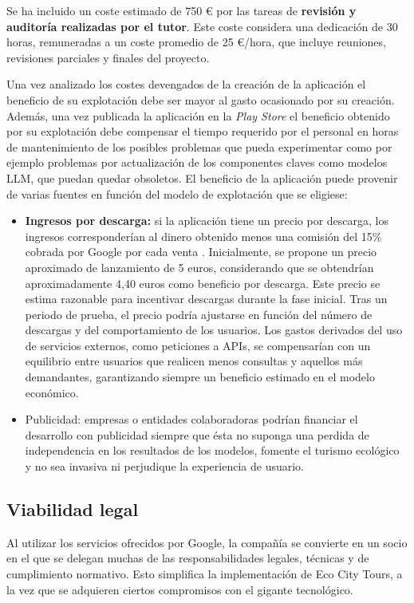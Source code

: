 \begin{enumerate}
Se ha incluido un coste estimado de 750 € por las tareas de \textbf{revisión y auditoría realizadas por el tutor}. Este coste considera una dedicación de 30 horas, remuneradas a un coste promedio de 25 €/hora, que incluye reuniones, revisiones parciales y finales del proyecto.


Una vez analizado los costes devengados de la creación de la aplicación el beneficio de su explotación debe ser mayor al gasto ocasionado por su creación. Además, una vez publicada la aplicación en la \textit{Play Store} el beneficio obtenido por su explotación debe compensar el tiempo requerido por el personal en horas de mantenimiento de los posibles problemas que pueda experimentar como por ejemplo problemas por actualización de los componentes claves como modelos LLM, que puedan quedar obsoletos. El beneficio de la aplicación puede provenir de varias fuentes en función del modelo de explotación que se eligiese:
\begin{itemize}
	\item \textbf{Ingresos por descarga:} si la aplicación tiene un precio por descarga, los ingresos corresponderían al dinero obtenido menos una comisión del 15\% cobrada por Google por cada venta \cite{googleplay_commission}. Inicialmente, se propone un precio aproximado de lanzamiento de 5 euros, considerando que se obtendrían aproximadamente 4,40 euros como beneficio por descarga. Este precio se estima razonable para incentivar descargas durante la fase inicial. Tras un periodo de prueba, el precio podría ajustarse en función del número de descargas y del comportamiento de los usuarios. Los gastos derivados del uso de servicios externos, como peticiones a APIs, se compensarían con un equilibrio entre usuarios que realicen menos consultas y aquellos más demandantes, garantizando siempre un beneficio estimado en el modelo económico.
	
	\item{Publicidad:} empresas o entidades colaboradoras podrían financiar el desarrollo con publicidad siempre que ésta no suponga una perdida de independencia en los resultados de los modelos, fomente el turismo ecológico y no sea invasiva ni perjudique la experiencia de usuario.
\end{itemize}

\subsection{Viabilidad legal}
Al utilizar los servicios ofrecidos por Google, la compañía se convierte en un socio en el que se delegan muchas de las responsabilidades legales, técnicas y de cumplimiento normativo. Esto simplifica la implementación de Eco City Tours, a la vez que se adquieren ciertos compromisos con el gigante tecnológico. 


\end{enumerate}
